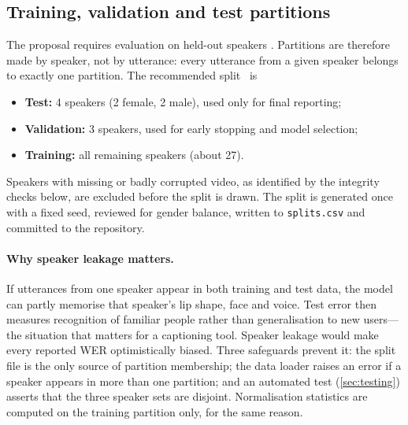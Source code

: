 \subsection{Training, validation and test partitions}
The proposal requires evaluation on held-out speakers \spec. Partitions are
therefore made by speaker, not by utterance: every utterance from a given
speaker belongs to exactly one partition. The recommended split \rec\ is
\begin{itemize}
  \item \textbf{Test:} 4 speakers (2 female, 2 male), used only for final reporting;
  \item \textbf{Validation:} 3 speakers, used for early stopping and model selection;
  \item \textbf{Training:} all remaining speakers (about 27).
\end{itemize}
Speakers with missing or badly corrupted video, as identified by the integrity
checks below, are excluded before the split is drawn. The split is generated
once with a fixed seed, reviewed for gender balance, written to
\texttt{splits.csv} and committed to the repository.

\paragraph{Why speaker leakage matters.}
If utterances from one speaker appear in both training and test data, the
model can partly memorise that speaker's lip shape, face and voice. Test error
then measures recognition of familiar people rather than generalisation to new
users---the situation that matters for a captioning tool. Speaker leakage
would make every reported WER optimistically biased. Three safeguards prevent
it: the split file is the only source of partition membership; the data loader
raises an error if a speaker appears in more than one partition; and an
automated test (\cref{sec:testing}) asserts that the three speaker sets are
disjoint. Normalisation statistics are computed on the training partition only,
for the same reason.

